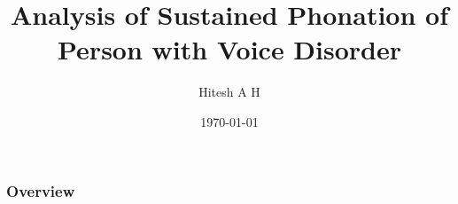 \documentclass{beamer}
\title[Project Presentation]{Analysis of Sustained Phonation of Person with Voice Disorder} %
\author{Hitesh A H} %
\institute[Government Engineering College, Barton Hill] %
{
\textit{TRV20ECSP14, Signal Processing} \\\textit{Department of Electronics and Communication Engineering} \\ %
\medskip
}
\date{\today} %
\begin{document}
\begin{frame}
\titlepage %
\end{frame}

\begin{frame}
\frametitle{Overview} %
\tableofcontents %
\end{frame}


\end{document}
